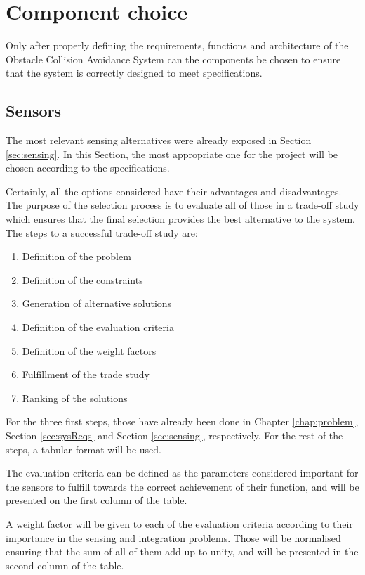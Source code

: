 \section{Component choice} \label{sec:choice}

Only after properly defining the requirements, functions and architecture of the Obstacle Collision Avoidance System can the components be chosen to ensure that the system is correctly designed to meet specifications.

\subsection{Sensors}

The most relevant sensing alternatives were already exposed in Section \ref{sec:sensing}.
In this Section, the most appropriate one for the project will be chosen according to the specifications.

Certainly, all the options considered have their advantages and disadvantages.
The purpose of the selection process is to evaluate all of those in a trade-off study which ensures that the final selection provides the best alternative to the system.
The steps to a successful trade-off study are:
\begin{enumerate}
	\item Definition of the problem
	\item Definition of the constraints
	\item Generation of alternative solutions
	\item Definition of the evaluation criteria
	\item Definition of the weight factors
	\item Fulfillment of the trade study
	\item Ranking of the solutions
\end{enumerate}

For the three first steps, those have already been done in Chapter \ref{chap:problem}, Section \ref{sec:sysReqs} and Section \ref{sec:sensing}, respectively.
For the rest of the steps, a tabular format will be used.

The evaluation criteria can be defined as the parameters considered important for the sensors to fulfill towards the correct achievement of their function, and will be presented on the first column of the table.

A weight factor will be given to each of the evaluation criteria according to their importance in the sensing and integration problems.
Those will be normalised ensuring that the sum of all of them add up to unity, and will be presented in the second column of the table.

